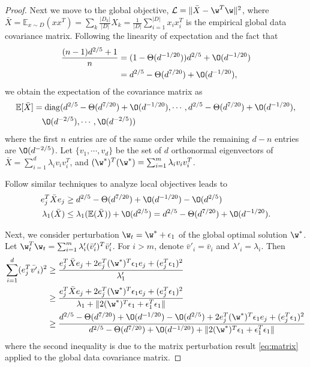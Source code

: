 \documentclass[a4paper,11pt]{article}
\begin{document}
\begin{proof}

Next we move to the global objective, $ \mathcal{L} = \|\bar{X} - \w^T \w \|^2$, where $\bar{X} = \mathbb{E}_{x \sim D}(xx^T) = \sum_k \frac{|D_k|}{|D|}X_k = \frac{1}{|D|}\sum_{i=1}^{|D|}x_i x_i^T$ is the empirical global data covariance matrix. Following the linearity of expectation and the fact that 
\begin{align*}
    \frac{(n-1)d^{2/5}+1}{n} & = (1 - \Theta(d^{-1/20}))d^{2/5} + \O(d^{-1/20}) \\
    & = d^{2/5} - \Theta(d^{7/20}) + \O(d^{-1/20}),
\end{align*}
we obtain the expectation of the covariance matrix as
\begin{align*}
    \mathbb{E}[{\bar{X}}] & = \mathrm{diag}( d^{2/5} - \Theta(d^{7/20}) + \O(d^{-1/20}), \cdots, d^{2/5} - \Theta(d^{7/20}) + \O(d^{-1/20}), \\
    & \quad \O(d^{-2/5}), \cdots, \O(d^{-2/5}) )
\end{align*}
where the first $n$ entries are of the same order while the remaining $d-n$ entries are $\O(d^{-2/5})$. Let $\{v_{1}, \cdots, v_{d} \}$ be the set of $d$ orthonormal eigenvectors of $\bar{X} = \sum_{i=1}^d \lambda_{i} v_{i}v_{i}^T$, and $(\w^*)^T(\w^*) = \sum_{i=1}^m \lambda_{i} v_{i}v_{i}^T $. 

Follow similar techniques to analyze local objectives leads to
\begin{align*}
    e_j^T \bar{X} e_j & \geq d^{2/5} - \Theta(d^{7/20}) + \O(d^{-1/20}) - \O(d^{2/5}) \\
    \lambda_1(\bar{X}) & \leq \lambda_1(\mathbb{E}(\bar{X})) + \O(d^{2/5}) = d^{2/5} - \Theta(d^{7/20}) + \O(d^{-1/20}).
\end{align*}

Next, we consider perturbation $\w_{t} = \w^* + \epsilon_1 $ of the global optimal solution $\w^*$. Let $\w_{t}^T \w_{t} = \sum_{i=1}^m \lambda'_{i} (\bar{v}'_{i})^T \bar{v}'_{i}$. For $i > m$, denote $\bar{v}'_{i} = \bar{v}_{i}$ and $\lambda'_{i} = \lambda_{i}$. Then
\begin{align*}
    \sum_{i=1}^d (e_j^T \bar{v'}_{i})^2 & \geq \frac{e_j^T \bar{X} e_j + 2e_j^T (\w^*)^T \epsilon_1 e_j + (e_j^T \epsilon_1)^2 }{\lambda'_{1}} \\
    & \geq \frac{e_j^T \bar{X} e_j + 2e_j^T (\w^*)^T \epsilon_1 e_j + (e_j^T \epsilon_1)^2 }{\lambda_{1} + \|2(\w^*)^T \epsilon_1 + \epsilon_1^T \epsilon_1 \|} \\
    & \geq \frac{d^{2/5} - \Theta(d^{7/20}) + \O(d^{-1/20}) - \O(d^{2/5}) + 2e_j^T (\w^*)^T \epsilon_1 e_j + (e_j^T \epsilon_1)^2 }{d^{2/5} - \Theta(d^{7/20}) + \O(d^{-1/20}) + \|2(\w^*)^T \epsilon_1 + \epsilon_1^T \epsilon_1  \|}
\end{align*}
where the second inequality is due to 
the matrix perturbation result \eqref{eq:matrix} applied to the global data covariance matrix.


\end{proof}
\end{document}
